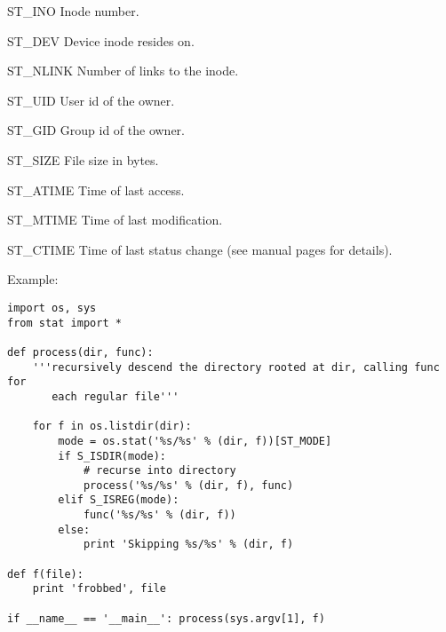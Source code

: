 \begin{datadesc}{ST_INO}
Inode number.
\end{datadesc}

\begin{datadesc}{ST_DEV}
Device inode resides on.
\end{datadesc}

\begin{datadesc}{ST_NLINK}
Number of links to the inode.
\end{datadesc}

\begin{datadesc}{ST_UID}
User id of the owner.
\end{datadesc}

\begin{datadesc}{ST_GID}
Group id of the owner.
\end{datadesc}

\begin{datadesc}{ST_SIZE}
File size in bytes.
\end{datadesc}

\begin{datadesc}{ST_ATIME}
Time of last access.
\end{datadesc}

\begin{datadesc}{ST_MTIME}
Time of last modification.
\end{datadesc}

\begin{datadesc}{ST_CTIME}
Time of last status change (see manual pages for details).
\end{datadesc}

Example:

\begin{verbatim}
import os, sys
from stat import *

def process(dir, func):
    '''recursively descend the directory rooted at dir, calling func for
       each regular file'''

    for f in os.listdir(dir):
        mode = os.stat('%s/%s' % (dir, f))[ST_MODE]
        if S_ISDIR(mode):
            # recurse into directory
            process('%s/%s' % (dir, f), func)
        elif S_ISREG(mode):
            func('%s/%s' % (dir, f))
        else:
            print 'Skipping %s/%s' % (dir, f)

def f(file):
    print 'frobbed', file

if __name__ == '__main__': process(sys.argv[1], f)
\end{verbatim}
